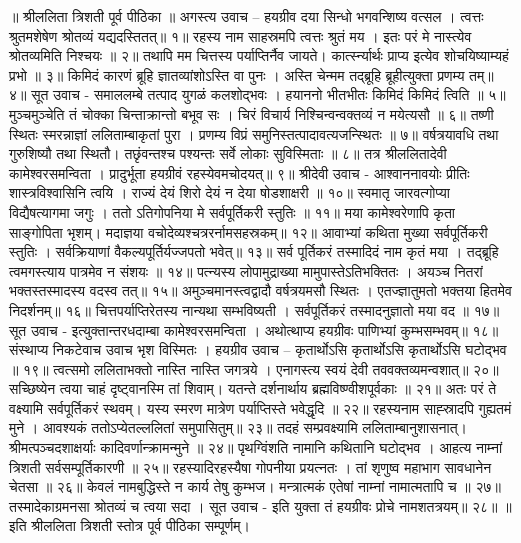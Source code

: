 ॥ श्रीललिता त्रिशती पूर्व पीठिका ॥
अगस्त्य उवाच –
हयग्रीव दया सिन्धो भगवन्शिष्य वत्सल ।
त्वत्तः श्रुतमशेषेण श्रोतव्यं यद्यदस्तितत्॥ १॥
रहस्य नाम साहस्रमपि त्वत्तः श्रुतं मय ।
इतः परं मे नास्त्येव श्रोतव्यमिति निश्चयः ॥ २॥
तथापि मम चित्तस्य पर्याप्तिर्नैव जायते।
कार्त्स्न्यार्थः प्राप्य इत्येव शोचयिष्याम्यहं प्रभो ॥ ३॥
किमिदं कारणं ब्रूहि ज्ञातव्यांशोऽस्ति वा पुनः ।
अस्ति चेन्मम तद्ब्रूहि ब्रूहीत्युक्ता प्रणम्य तम्॥ ४॥
सूत उवाच -
समाललम्बे तत्पाद युगळं कलशोद्भवः ।
हयाननो भीतभीतः किमिदं किमिदं त्विति ॥ ५॥
मुञ्चमुञ्चेति तं चोक्का चिन्ताक्रान्तो बभूव सः ।
चिरं विचार्य निश्चिन्वन्वक्तव्यं न मयेत्यसौ ॥ ६॥
तष्णी स्थितः स्मरन्नाज्ञां ललिताम्बाकृतां पुरा ।
प्रणम्य विप्रं समुनिस्तत्पादावत्यजन्स्थितः ॥ ७॥
वर्षत्रयावधि तथा गुरुशिष्यौ तथा स्थितौ।
तछृंवन्तश्च पश्यन्तः सर्वे लोकाः सुविस्मिताः ॥ ८॥
तत्र श्रीललितादेवी कामेश्वरसमन्विता ।
प्रादुर्भूता हयग्रीवं रहस्येवमचोदयत्॥ ९॥
श्रीदेवी उवाच -
आश्वाननावयोः प्रीतिः शास्त्रविश्वासिनि त्वयि ।
राज्यं देयं शिरो देयं न देया षोडशाक्षरी ॥ १०॥
स्वमातृ जारवत्गोप्या विद्यैषत्यागमा जगुः ।
ततो ऽतिगोपनिया मे सर्वपूर्तिकरी स्तुतिः ॥ ११॥
मया कामेश्वरेणापि कृता साङ्गोपिता भृशम्।
मदाज्ञया वचोदेव्यश्चत्ररर्नामसहस्रकम्॥ १२॥
आवाभ्यां कथिता मुख्या सर्वपूर्तिकरी स्तुतिः ।
सर्वक्रियाणां वैकल्यपूर्तिर्यज्जपतो भवेत्॥ १३॥
सर्व पूर्तिकरं तस्मादिदं नाम कृतं मया ।
तद्ब्रूहि त्वमगस्त्याय पात्रमेव न संशयः ॥ १४॥
पत्न्यस्य लोपामुद्राख्या मामुपास्तेऽतिभक्तितः ।
अयञ्च नितरां भक्तस्तस्मादस्य वदस्व तत्॥ १५॥
अमुञ्चमानस्त्वद्वादौ वर्षत्रयमसौ स्थितः ।
एतज्ज्ञातुमतो भक्तया हितमेव निदर्शनम्॥ १६॥
चित्तपर्याप्तिरेतस्य नान्यथा सम्भविष्यती ।
सर्वपूर्तिकरं तस्मादनुज्ञातो मया वद ॥ १७॥
सूत उवाच -
इत्युक्तान्तरधदाम्बा कामेश्वरसमन्विता ।
अथोत्थाप्य हयग्रीवः पाणिभ्यां कुम्भसम्भवम्॥ १८॥
संस्थाप्य निकटेवाच उवाच भृश विस्मितः ।
हयग्रीव उवाच –
कृतार्थोऽसि कृतार्थोऽसि कृतार्थोऽसि घटोद्भव ॥ १९॥
त्वत्समो ललिताभक्तो नास्ति नास्ति जगत्रये ।
एनागस्त्य स्वयं देवी तववक्तव्यमन्वशात्॥ २०॥
सच्छिष्येन त्वया चाहं दृष्ट्वानस्मि तां शिवाम्।
यतन्ते दर्शनार्थाय ब्रह्मविष्ण्वीशपूर्वकाः ॥ २१॥
अतः परं ते वक्ष्यामि सर्वपूर्तिकरं स्थवम्।
यस्य स्मरण मात्रेण पर्याप्तिस्ते भवेद्धृदि ॥ २२॥
रहस्यनाम साह्स्रादपि गुह्यतमं मुने ।
आवश्यकं ततोऽप्येतल्ललितां समुपासितुम्॥ २३॥
तदहं सम्प्रवक्ष्यामि ललिताम्बानुशासनात्।
श्रीमत्पञ्चदशाक्षर्याः कादिवर्णान्क्रामन्मुने ॥ २४॥
पृथग्विंशति नामानि कथितानि घटोद्भव ।
आहत्य नाम्नां त्रिशती सर्वसम्पूर्तिकारणी ॥ २५॥
रहस्यादिरहस्यैषा गोपनीया प्रयत्नतः ।
तां शृणुष्व महाभाग सावधानेन चेतसा ॥ २६॥
केवलं नामबुद्धिस्ते न कार्य तेषु कुम्भज।
मन्त्रात्मकं एतेषां नाम्नां नामात्मतापि च ॥ २७॥
तस्मादेकाग्रमनसा श्रोतव्यं च त्वया सदा ।
सूत उवाच -
इति युक्ता तं हयग्रीवः प्रोचे नामशतत्रयम्॥ २८॥
॥ इति श्रीललिता त्रिशती स्तोत्र पूर्व पीठिका सम्पूर्णम्।

